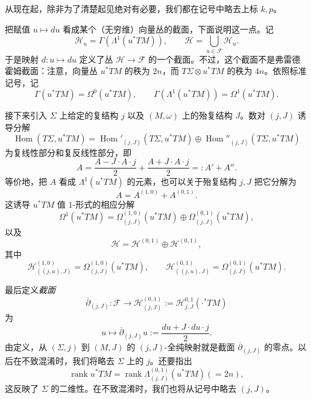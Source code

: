 从现在起，除非为了清楚起见绝对有必要，我们都在记号中略去上标 $k,p$。

把赋值 $u\mapsto du$ 看成某个（无穷维）向量丛的截面，下面说明这一点。记
\[
 \mathcal H_u=\Gamma(\Lambda^1(u^*TM)),
 \qquad
 \mathcal H=\bigcup_{u\in\mathcal F}\mathcal H_u.
\]
于是映射 $d:u\mapsto du$ 定义了丛 $\mathcal H\to\mathcal F$ 的一个截面。不过，这个截面不是弗雷德霍姆截面：注意，向量丛 $u^*TM$ 的秩为 $2n$，而
$T\Sigma\otimes u^*TM$ 的秩为 $4n$。依照标准记号，记
\[
 \Gamma(u^*TM)=\Omega^0(u^*TM),
 \qquad
 \Gamma(\Lambda^1(u^*TM))=\Omega^1(u^*TM).
\]

接下来引入 $\Sigma$ 上给定的复结构 $j$ 以及 $(M,\omega)$ 上的殆复结构 $J$。数对 $(j,J)$ 诱导分解
\[
 \operatorname{Hom}(T\Sigma,u^*TM)
 =\operatorname{Hom}'_{(j,J)}(T\Sigma,u^*TM)
 \oplus
 \operatorname{Hom}''_{(j,J)}(T\Sigma,u^*TM)
\]
为复线性部分和复反线性部分，即
\[
 A=\frac{A-J\cdot A\cdot j}{2}
   +\frac{A+J\cdot A\cdot j}{2}
   =:A'+A''.
\]
等价地，把 $A$ 看成 $\Lambda^1(u^*TM)$ 的元素，也可以关于殆复结构 $j,J$ 把它分解为
\[
 A=A^{(1,0)}+A^{(0,1)}.
\]
这诱导 $u^*TM$ 值 $1$-形式的相应分解
\[
 \Omega^1(u^*TM)
 =\Omega^{(1,0)}_{(j,J)}(u^*TM)
 \oplus\Omega^{(0,1)}_{(j,J)}(u^*TM),
\]
以及
\[
 \mathcal H=\mathcal H^{(0,1)}\oplus\mathcal H^{(0,1)},
\]
其中
\[
 \mathcal H^{(1,0)}_{((j,u),J)}
 =\Omega^{(1,0)}_{(j,J)}(u^*TM),
 \qquad
 \mathcal H^{(0,1)}_{((j,u),J)}
 =\Omega^{(0,1)}_{(j,J)}(u^*TM).
\]

最后定义\emph{截面}
\[
 \overline\partial_{(j,J)}:\mathcal F\longrightarrow
 \mathcal H^{(0,1)}_{(j,J)}
 :=\mathcal H^{0,1}_{j,J}(\mathord\cdot^*TM)
\]
为
\[
 u\longmapsto
 \overline\partial_{(j,J)}u:=\frac{du+J\cdot du\cdot j}{2}.
\]
由定义，从 $(\Sigma,j)$ 到 $(M,J)$ 的 $(j,J)$-全纯映射就是截面
$\overline\partial_{(j,J)}$ 的零点。以后在不致混淆时，我们将略去 $\Sigma$ 上的 $j$。还要指出
\[
 \operatorname{rank}u^*TM
 =\operatorname{rank}\Lambda^{(0,1)}_{(j,J)}(u^*TM)(=2n),
\]
这反映了 $\Sigma$ 的二维性。在不致混淆时，我们也将从记号中略去 $(j,J)$。
